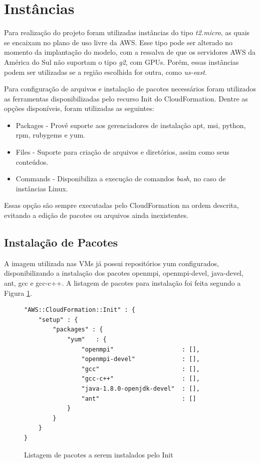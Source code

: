 \documentclass[tg]{mdtufsm}
\begin{document}
\section{Instâncias}

Para realização do projeto foram utilizadas instâncias do tipo \emph{t2.micro}, as quais se encaixam no plano de uso livre da AWS. Esse tipo pode ser alterado no momento da implantação do modelo, com a ressalva de que os servidores AWS da América do Sul não suportam o tipo \emph{g2}, com GPUs. Porém, essas instâncias podem ser utilizadas se a região escolhida for outra, como \emph{us-east}.

Para configuração de arquivos e instalação de pacotes necessários foram utilizados as ferramentas disponibilizadas pelo recurso Init do CloudFormation. Dentre as opções disponíveis, foram utilizadas as seguintes:

\begin{itemize}
\item Packages - Provê suporte aos gerenciadores de instalação apt, msi, python, rpm, rubygems e yum. 
\item Files - Suporte para criação de arquivos e diretórios, assim como seus conteúdos.
\item Commands - Disponibiliza a execução de comandos \emph{bash}, no caso de instâncias Linux.
\end{itemize}

Essas opção são sempre executadas pelo CloudFormation na ordem descrita, evitando a edição de pacotes ou arquivos ainda inexistentes.

\subsection{Instalação de Pacotes}

A imagem utilizada nas VMs já possui repositórios yum configurados, disponibilizando a instalação dos pacotes openmpi, openmpi-devel, java-devel, ant, gcc e gcc-c++. A listagem de pacotes para instalação foi feita segundo a Figura \ref{pacotes}.

\begin{figure}
\centering
\begin{lstlisting}[frame=single, numbers=none]
"AWS::CloudFormation::Init" : {
	"setup" : {
		"packages" : {
			"yum"	: {
				"openmpi"					: [],
				"openmpi-devel"				: [],
				"gcc"						: [],
				"gcc-c++"					: [],
				"java-1.8.0-openjdk-devel"	: [],
				"ant"						: []
			}
		}
	}
}
\end{lstlisting}
\caption{Listagem de pacotes a serem instalados pelo Init}
\label{pacotes}
\end{figure}
\end{document}
